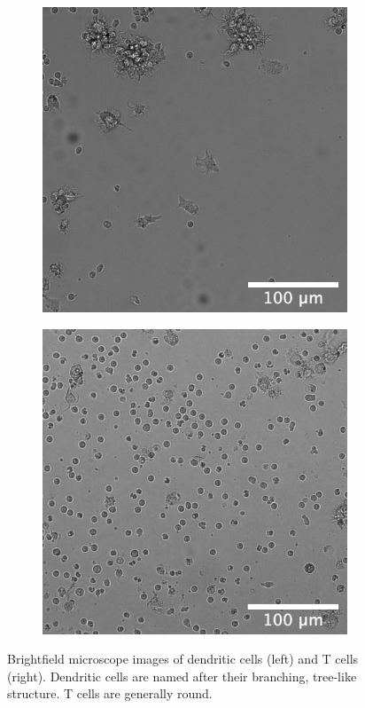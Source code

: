\begin{figure}[h]
    \centering
    \begin{subfigure}[h!]{0.3\textwidth}
        \includegraphics[width=\textwidth]{dissertation/figures/example_DCs_CK19O21.png}
    \end{subfigure}
    \begin{subfigure}[h!]{0.3\textwidth}
        \includegraphics[width=\textwidth]{dissertation/figures/example_Tcells_CK22B12.png}
    \end{subfigure}
    \caption{Brightfield microscope images of dendritic cells (left) and T cells (right). Dendritic cells are named after their branching, tree-like structure. T cells are generally round.}
    \label{fig:real_cells}
\end{figure}

